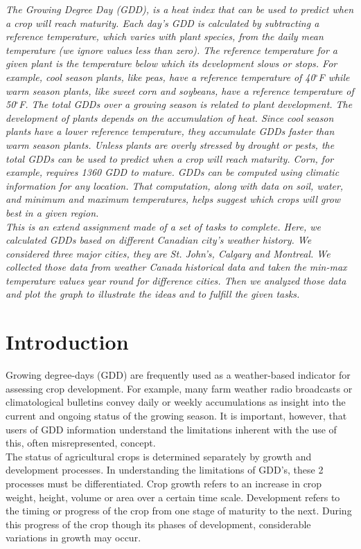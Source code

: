 \documentclass{article}
\begin{document}
{\itshape The Growing Degree Day (GDD), is a heat index that can be used to predict when a crop will reach maturity. Each day’s GDD is calculated by subtracting a reference temperature, which varies with plant species, from the daily mean temperature (we ignore values less than zero). The reference temperature for a given plant is the temperature below which its development slows or stops. For example, cool season plants, like peas, have a reference temperature of 40$^{\circ}$F while warm season plants, like sweet corn and soybeans, have a reference temperature of 50$^{\circ}$F. The total GDDs over a growing season is related to plant development. The development of plants depends on the accumulation of heat. Since cool season plants have a lower reference temperature, they accumulate GDDs faster than warm season plants. Unless plants are overly stressed by drought or pests, the total GDDs can be used to predict when a crop will reach maturity. Corn, for example, requires 1360 GDD to mature. GDDs can be computed using climatic information for any location. That computation, along with data on soil, water, and minimum and maximum temperatures, helps suggest which crops will grow best in a given region.\\ [\baselineskip] This is an extend assignment made of a set of tasks to complete. Here, we calculated GDDs based on different Canadian city's weather history. We considered three major cities, they are St. John’s, Calgary and Montreal. We collected those data from weather Canada historical data and taken the min-max temperature values year round for difference cities. Then we analyzed those data and plot the graph to illustrate the ideas and to fulfill the given tasks. 
}

\newpage
\tableofcontents
\newpage

\section{ \bf Introduction}
Growing degree-days (GDD) are frequently used as a weather-based indicator for assessing crop development. For example, many farm weather radio broadcasts or climatological bulletins convey daily or weekly accumulations as insight into the current and ongoing status of the growing season. It is important, however, that users of GDD information understand the limitations inherent with the use of this, often misrepresented, concept.\\ [\baselineskip] The status of agricultural crops is determined separately by growth and development processes. In understanding the limitations of GDD's, these 2 processes must be differentiated. Crop growth refers to an increase in crop weight, height, volume or area over a certain time scale. Development refers to the timing or progress of the crop from one stage of maturity to the next. During this progress of the crop though its phases of development, considerable variations in growth may occur. 
\end{document}
